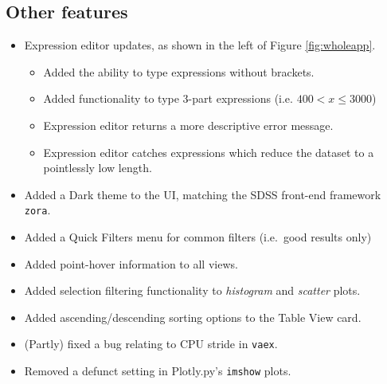 \documentclass[a4paper,10pt,twocolumn]{article}
\begin{document}
\subsection{Other features}
\label{sec:other}
\begin{itemize}
	\item Expression editor updates, as shown in the left of Figure \ref{fig:wholeapp}.
	      \begin{itemize}
		      \item Added the ability to type expressions without brackets.
		      \item Added functionality to type 3-part expressions (i.e. $400 < x \le 3000$)
		      \item Expression editor returns a more descriptive error message.
		      \item Expression editor catches expressions which reduce the dataset to a pointlessly low length.
	      \end{itemize}
	\item Added a Dark theme to the UI, matching the SDSS front-end framework \texttt{zora}.
	\item Added a Quick Filters menu for common filters (i.e.\ good results only)
	\item Added point-hover information to all views.
	\item Added selection filtering functionality to \emph{histogram} and \emph{scatter} plots.
	\item Added ascending/descending sorting options to the Table View card.
	\item (Partly) fixed a bug relating to CPU stride in \texttt{vaex}.
	\item Removed a defunct setting in Plotly.py's \texttt{imshow} plots.
\end{itemize}
\end{document}
